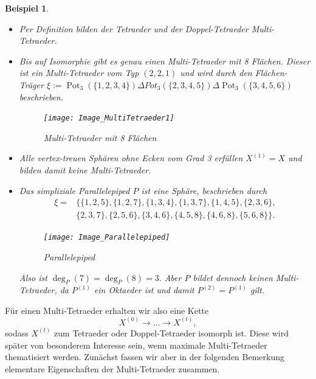\documentclass[12pt,titlepage,twoside,cleardoublepage]{article}
\theoremstyle{nummermitklammern}
\newtheorem{bsp}[temp]{Beispiel}
\newtheorem{bsp}[zahl]{Beispiel}
\numberwithin{equation}{section}
\DeclareMathOperator{\Pot}{Pot}
\begin{document}
\begin{bsp} \label{bspCactus}
\begin{itemize}
\item Per Definition bilden der Tetraeder und der Doppel-Tetraeder Multi-Tetraeder.
\item Bis auf Isomorphie gibt es genau einen Multi-Tetraeder mit 8 Flächen. Dieser ist ein Multi-Tetraeder vom Typ $(2,2,1)$ und wird durch den Flächen-Träger $\xi:=\Pot_3(\{1,2,3,4\})\Delta Pot_3(\{2,3,4,5\})\Delta \Pot_3(\{3,4,5,6\})$ beschrieben. 
\begin{figure}[H]
\begin{center}
\texttt{[image: Image\_MultiTetraeder1]}
\end{center}
\caption{Multi-Tetraeder mit 8 Flächen}
\end{figure}
\item Alle vertex-treuen Sphären ohne Ecken vom Grad 3 erfüllen $X^{(1)}=X$ und bilden damit keine Multi-Tetraeder.
\item Das simpliziale Parallelepiped $P$ ist eine Sphäre, beschrieben durch 
\begin{align*}
\xi=&\{ \{1, 2, 5 \}, \{ 1, 2, 7 \}, \{ 1, 3, 4 \}, \{ 1, 3, 7 \}, \{ 1, 4, 5 \},\{ 2, 3, 6 \},\\ &\{2, 3, 7 \}, 
\{ 2, 5, 6 \}, \{ 3, 4, 6 \}, \{ 4, 5, 8 \},\{ 4, 6, 8 \}, \{ 5, 6, 8 \} \}.
\end{align*}
\begin{figure}[H]
\begin{center}
\texttt{[image: Image\_Parallelepiped]}
\end{center}
\caption{Parallelepiped}
\end{figure}
Also ist $\deg_P(7)=\deg_P(8)=3.$ Aber $P$ bildet dennoch keinen Multi-Tetraeder, da $P^{(1)}$ ein Oktaeder ist und damit $P^{(2)}=P^{(1)}$ gilt.
\end{itemize}
\end{bsp}
Für einen Multi-Tetraeder erhalten wir also eine Kette 
\[
X^{(0)}\to \ldots \to X^{(t)},
\] 
sodass $X^{(t)}$ zum Tetraeder oder Doppel-Tetraeder isomorph ist.
Diese wird später von besonderem Interesse sein, wenn maximale Multi-Tetraeder thematisiert werden. Zunächst fassen wir aber in der folgenden Bemerkung elementare Eigenschaften der Multi-Tetraeder zusammen.
\end{document}

